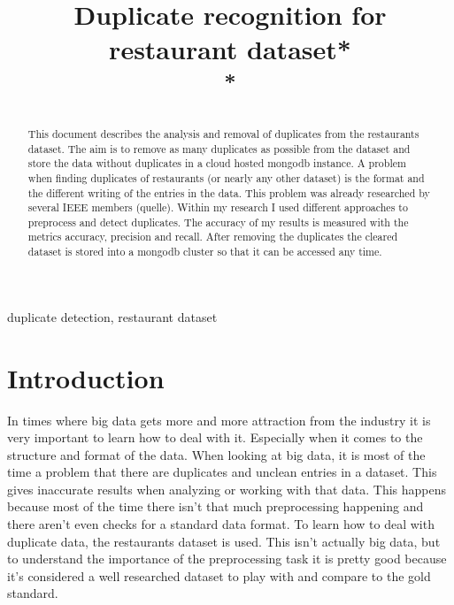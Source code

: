 \documentclass[conference]{IEEEtran}
\begin{document}
\title{Duplicate recognition for restaurant dataset*\\
	{\footnotesize \textsuperscript{*}}
}
\author{
}


\maketitle

\begin{abstract}
This document describes the analysis and removal of duplicates from the restaurants dataset. The aim is to remove as many duplicates as possible from the dataset and store the data without duplicates in a cloud hosted mongodb instance. A problem when finding duplicates of restaurants (or nearly any other dataset) is the format and the different writing of the entries in the data. This problem was already researched by several IEEE members (quelle). Within my research I used different approaches to preprocess and detect duplicates. The accuracy of my results is measured with the metrics accuracy, precision and recall. After removing the duplicates the cleared dataset is stored into a mongodb cluster so that it can be accessed any time.
\end{abstract}

\begin{IEEEkeywords}
duplicate detection, restaurant dataset
\end{IEEEkeywords}

\section{Introduction}
In times where big data gets more and more attraction from the industry it is very important to learn how to deal with it. Especially when it comes to the structure and format of the data. When looking at big data, it is most of the time a problem that there are duplicates and unclean entries in a dataset. This gives inaccurate results when analyzing or working with that data. This happens because most of the time there isn't that much preprocessing happening and there aren't even checks for a standard data format. To learn how to deal with duplicate data, the restaurants dataset is used. This isn't actually big data, but to understand the importance of the preprocessing task it is pretty good because it's considered a well researched dataset to play with and compare to the gold standard. 
\end{document}
